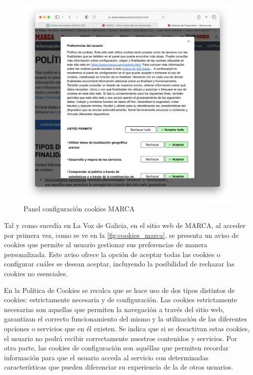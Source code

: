 \begin{figure}[H]   
    \includegraphics[width=15cm]{panel_cookies_marca.png}
    \caption{Panel configuración cookies MARCA}
    \label{fig:panel_cookies_marca}
\end{figure}

Tal y como sucedía en La Voz de Galicia, en el sitio web de MARCA, al acceder por primera vez, como se ve en la \ref{fig:cookies_marca}, se presenta un aviso de cookies que permite al usuario gestionar sus preferencias de manera personalizada. Este aviso ofrece la opción de aceptar todas las cookies o configurar cuáles se desean aceptar, incluyendo la posibilidad de rechazar las cookies no esenciales.  

En la Política de Cookies se recalca que se hace uso de dos tipos distintos de cookies: estrictamente necesaria y de configuración. Las cookies estrictamente necesarias son aquellas que permiten la navegación a través del sitio web, garantizan el correcto funcionamiento del mismo y la utilización de las diferentes opciones o servicios que en él existen. Se indica que si se desactivan estas cookies, el usuario no podrá recibir correctamente nuestros contenidos y servicios. Por otra parte, las cookies de configuración son aquéllas que permiten recordar información para que el usuario acceda al servicio con determinadas características que pueden diferenciar su experiencia de la de otros usuarios. 


